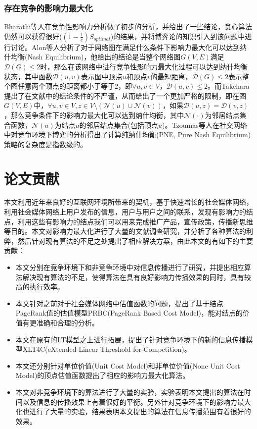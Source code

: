 \subsubsection{存在竞争的影响力最大化}
Bharathi\cite{bharathi2007competitive}等人在竞争性影响力分析做了初步的分析，并给出了一些结论，贪心算法仍然可以获得很好($(1-\frac{1}{e}) S_{optimal}$)的结果，并将博弈论的知识引入到该问题中进行讨论。Alon\cite{alon2010note}等人分析了对于网络图在满足什么条件下影响力最大化可以达到纳什均衡(Nash Equilibrium)，他给出的结论是当整个网络图$G(V, E)$满足$\mathcal{D}(G) \le 2$时，那么在该网络中进行竞争性影响力最大化过程可以达到纳什均衡状态，其中函数$\mathcal{D}(u, v)$表示图中顶点$u$和顶点$v$的最短距离，$\mathcal{D}(G) \le 2$表示整个图任意两个顶点的距离都小于等于$2$，即$\forall u, v \in V$，$\mathcal{D}(u,v) \le 2$。而Takehara\cite{takehara2012comment}提出了在文献\cite{alon2010note}中的结论条件的不严谨，从而给出了一个更加严格的限制，即在图$G(V, E)$中，$\forall u, v \in V, z \in V\setminus (\mathcal{N}(u)\cup\mathcal{N}(v))$，如果$\mathcal{D}(u,z)=\mathcal{D}(v,z)$，那么竞争条件下的影响力最大化可以达到纳什均衡，其中$\mathcal{N}(\cdot)$为邻居结点集合函数，$\mathcal{N}(u)$为结点$u$的邻居结点集合(包括顶点$u$)。Tzoumas\cite{tzoumas2012game}等人在社交网络中对竞争环境下博弈的分析得出了计算纯纳什均衡(PNE, Pure Nash Equilibrium)策略的复杂度是指数级的。


\section{论文贡献}
本文利用近年来良好的互联网环境所带来的契机，基于快速增长的社会媒体网络，利用社会媒体网络上用户发布的信息，用户与用户之间的联系，发现有影响力的结点，利用这些有影响力的结点我们可以用来完成推广产品，宣传政策，传播新思维等目的。本文对影响力最大化进行了大量的文献调查研究，并分析了各种算法的利弊，然后针对现有算法的不足之处提出了相应解决方案，由此本文的有如下的主要贡献：
\begin{itemize}
\item 本文分别在竞争环境下和非竞争环境中对信息传播进行了研究，并提出相应算法解决现有算法的不足，使得算法在具有良好影响力传播效果的同时，具有较高的执行效率。
\item 本文针对之前对于社会媒体网络中估值函数的问题，提出了基于结点PageRank值的估值模型PRBC(PageRank Based Cost Model)，能对结点的价值有更准确和合理的分析。
\item 本文在原有的LT模型之上进行拓展，提出了针对竞争环境下的新的信息传播模型XLT4C(eXtended Linear Threshold for Competition)。
\item 本文还分别针对单位价值(Unit Cost Model)和非单位价值(None Unit Cost Model)的顶点估值函数提出了相应的影响力最大化算法。
\item 本文对非竞争环境下的算法进行了大量的实验，实验表明本文提出的算法在时间以及信息的传播效果上有着很好的平衡。另外针对竞争环境下的影响力最大化也进行了大量的实验，结果表明本文提出的算法在信息传播范围有着很好的效果。
\end{itemize}



